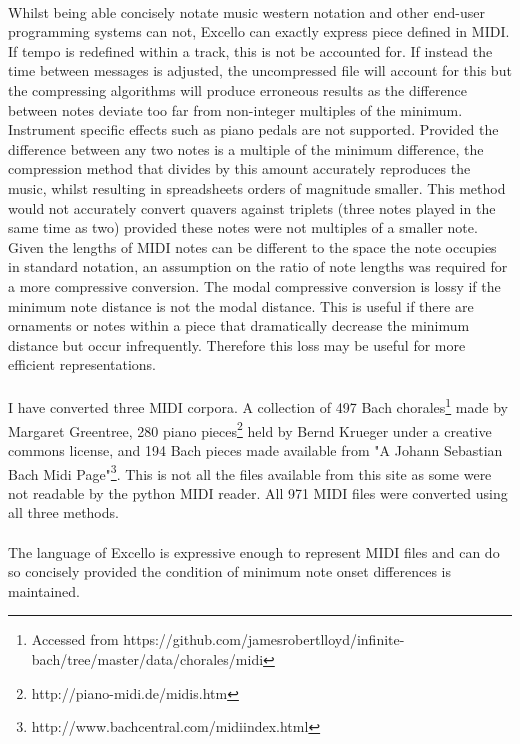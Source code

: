 \paragraph{} Whilst being able concisely notate music western notation and other end-user programming systems can not, Excello can exactly express piece defined in MIDI. If tempo is redefined within a track, this is not be accounted for. If instead the time between messages is adjusted, the uncompressed file will account for this but the compressing algorithms will produce erroneous results as the difference between notes deviate too far from non-integer multiples of the minimum. Instrument specific effects such as piano pedals are not supported. Provided the difference between any two notes is a multiple of the minimum difference, the compression method that divides by this amount accurately reproduces the music, whilst resulting in spreadsheets orders of magnitude smaller. This method would not accurately convert quavers against triplets (three notes played in the same time as two) provided these notes were not multiples of a smaller note. Given the lengths of MIDI notes can be different to the space the note occupies in standard notation, an assumption on the ratio of note lengths was required for a more compressive conversion. The modal compressive conversion is lossy if the minimum note distance is not the modal distance. This is useful if there are ornaments or notes within a piece that dramatically decrease the minimum distance but occur infrequently. Therefore this loss may be useful for more efficient representations.

\paragraph{} I have converted three MIDI corpora. A collection of 497 Bach chorales\footnote{Accessed from https://github.com/jamesrobertlloyd/infinite-bach/tree/master/data/chorales/midi} made by Margaret Greentree, 280 piano pieces\footnote{http://piano-midi.de/midis.htm} held by Bernd Krueger under a creative commons license, and 194 Bach pieces made available from "A Johann Sebastian Bach Midi Page"\footnote{http://www.bachcentral.com/midiindex.html}. This is not all the files available from this site as some were not readable by the python MIDI reader. All 971 MIDI files were converted using all three methods.

\paragraph{} The language of Excello is expressive enough to represent MIDI files and can do so concisely provided the condition of minimum note onset differences is maintained.

